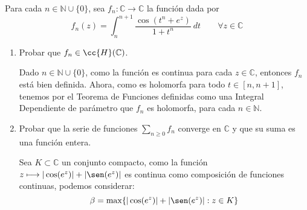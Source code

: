 \documentclass[12pt]{article}
\begin{document}
    \newpage
    \setcounter{ejercicio}{0}
    \begin{ejercicio}[2.5 puntos]
        Para cada $n\in \mathbb{N}\cup \{0\}$, sea $f_n:\mathbb{C}\to\mathbb{C}$ la función dada por
        \begin{equation*}
            f_n(z) = \int_{n}^{n+1} \dfrac{\cos(t^n+e^z)}{1+t^n}~dt  \qquad \forall z\in \mathbb{C}
        \end{equation*}
        \begin{enumerate}[label=\alph*)]
            \item Probar que $f_n\in \cc{H}(\mathbb{C})$.

                Dado $n\in \mathbb{N}\cup \{0\}$, como la función 
                es continua para cada $z\in \mathbb{C}$, entonces $f_n$ está bien definida. Ahora, como
                es holomorfa para todo $t\in [n,n+1]$, tenemos por el Teorema de Funciones definidas como una Integral Dependiente de parámetro que $f_n$ es holomorfa, para cada $n\in \mathbb{N}$.
            \item Probar que la serie de funciones $\sum\limits_{n\geq 0} f_n$ converge en $\mathbb{C}$ y que su suma es una función entera.

                Sea $K\subset \mathbb{C}$ un conjunto compacto, como la función $z\longmapsto |\cos(e^z)|+|\sen(e^z)|$ es continua como composición de funciones continuas, podemos considerar:
                \begin{equation*}
                    \beta = \max\{|\cos(e^z)|+|\sen(e^z)| : z\in K\}
                \end{equation*}


\end{enumerate}
\end{ejercicio}
\end{document}
